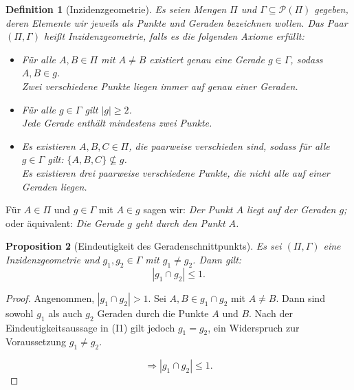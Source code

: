 \documentclass[a4paper,12pt]{article}
\theoremstyle{break}
\newtheorem{definition}{Definition}[section]
\newtheorem{proposition}[definition]{Proposition}
\begin{document}
\begin{definition}[Inzidenzgeometrie]
Es seien Mengen $\Pi$ und $\Gamma \subseteq \mathcal{P}(\Pi)$ gegeben, deren Elemente wir jeweils als \textit{Punkte} und \textit{Geraden} bezeichnen wollen. Das Paar $(\Pi, \Gamma)$ heißt \textit{Inzidenzgeometrie}, falls es die folgenden Axiome erfüllt:
\begin{itemize}
    \item[\textbf{(I1)}] Für alle $A, B \in \Pi$ mit $A \neq B$ existiert genau eine Gerade $g \in \Gamma$, sodass $A, B \in g$. \\
    Zwei verschiedene Punkte liegen immer auf genau einer Geraden.
    \item[\textbf{(I2)}] Für alle $g \in \Gamma$ gilt $|g| \geq 2$. \\
    Jede Gerade enthält mindestens zwei Punkte.
    \item[\textbf{(I3)}] Es existieren $A, B, C \in \Pi$, die paarweise verschieden sind, sodass für alle $g \in \Gamma$ gilt: $\{A, B, C\} \nsubseteq g$. \\
    Es existieren drei paarweise verschiedene Punkte, die nicht alle auf einer Geraden liegen.
\end{itemize}
\end{definition}
Für $A \in \Pi$ und $g \in \Gamma$ mit $A \in g$ sagen wir: \textit{Der Punkt $A$ liegt auf der Geraden $g$;} oder äquivalent: \textit{Die Gerade $g$ geht durch den Punkt $A$.}

\begin{proposition}[Eindeutigkeit des Geradenschnittpunkts]\label{prop:eindeutig_schnittpunkt}
Es sei $(\Pi, \Gamma)$ eine Inzidenzgeometrie und $g_1, g_2 \in \Gamma$ mit $g_1 \neq g_2$. Dann gilt: 
\[
|g_1 \cap g_2| \leq 1.
\]
\end{proposition}

\begin{proof}
Angenommen, $|g_1 \cap g_2| > 1$. Sei $A, B \in g_1 \cap g_2$ mit $A \neq B$. Dann sind sowohl $g_1$ als auch $g_2$ Geraden durch die Punkte $A$ und $B$. Nach der Eindeutigkeitsaussage in (I1) gilt jedoch $g_1 = g_2$, ein Widerspruch zur Voraussetzung $g_1 \neq g_2$. 

\[
\Rightarrow |g_1 \cap g_2| \leq 1.
\]
\end{proof}
\end{document}
